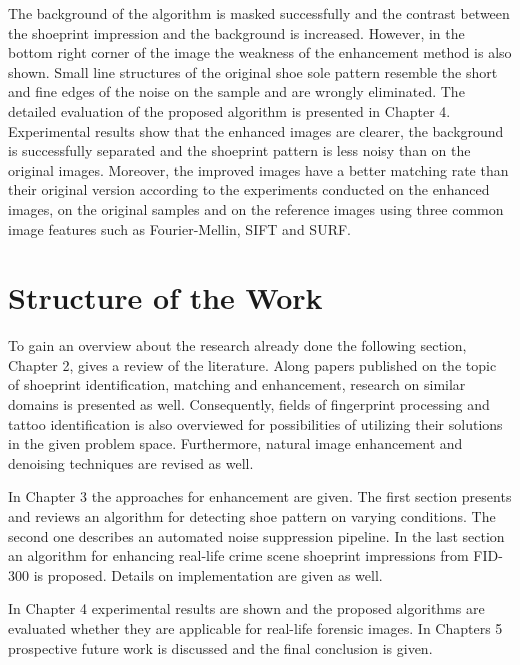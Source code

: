 \documentclass[draft,final]{vutinfth} %
\begin{document}
The background of the algorithm is masked successfully and the contrast between the shoeprint impression and the background is increased.
However, in the bottom right corner of the image the weakness of the enhancement method is also shown.
Small line structures of the original shoe sole pattern resemble the short and fine edges of the noise on the sample and are wrongly eliminated.
The detailed evaluation of the proposed algorithm is presented in Chapter 4.
Experimental results show that the enhanced images are clearer, the background is successfully separated and the shoeprint pattern is less noisy than on the original images.
Moreover, the improved images have a better matching rate than their original version according to the experiments conducted on the enhanced images, on the original samples and on the reference images using three common image features such as Fourier-Mellin, SIFT and SURF.

\section{Structure of the Work}
\par
To gain an overview about the research already done the following section, Chapter 2, gives a review of the literature. 
Along papers published on the topic of shoeprint identification, matching and enhancement, research on similar domains is presented as well.
Consequently, fields of fingerprint processing and tattoo identification is also overviewed for possibilities of utilizing their solutions in the given problem space.
Furthermore, natural image enhancement and denoising techniques are revised as well.
\par
In Chapter 3 the approaches for enhancement are given.
The first section presents and reviews an algorithm for detecting shoe pattern on varying conditions.
The second one describes an automated noise suppression pipeline.
In the last section an algorithm for enhancing real-life crime scene shoeprint impressions from FID-300 is proposed.
Details on implementation are given as well.
\par
In Chapter 4 experimental results are shown and the proposed algorithms are evaluated whether they are applicable for real-life forensic images.
In Chapters 5 prospective future work is discussed and the final conclusion is given. 
\end{document}
